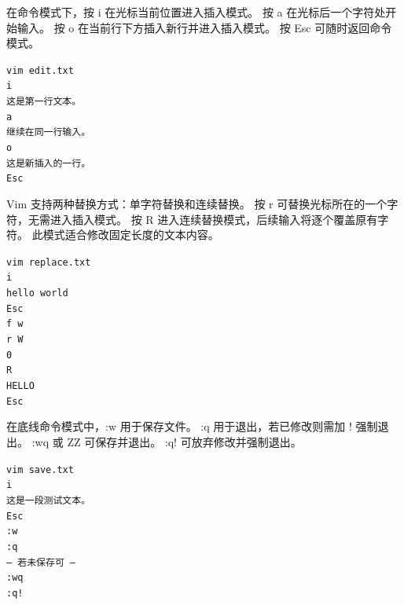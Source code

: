 \documentclass[a4paper, 12pt]{article}
\begin{document}
\begin{tcolorbox}[instancestyle, title=实例16：进入与退出插入模式]
在命令模式下，按 i 在光标当前位置进入插入模式。
按 a 在光标后一个字符处开始输入。
按 o 在当前行下方插入新行并进入插入模式。
按 Esc 可随时返回命令模式。

\texttt{vim edit.txt} \\
\texttt{i} \\
\texttt{这是第一行文本。} \\
\texttt{a} \\
\texttt{继续在同一行输入。} \\
\texttt{o} \\
\texttt{这是新插入的一行。} \\
\texttt{Esc}
\end{tcolorbox}

\begin{tcolorbox}[instancestyle, title=实例17：替换模式与文本覆盖]
Vim 支持两种替换方式：单字符替换和连续替换。
按 r 可替换光标所在的一个字符，无需进入插入模式。
按 R 进入连续替换模式，后续输入将逐个覆盖原有字符。
此模式适合修改固定长度的文本内容。

\texttt{vim replace.txt} \\
\texttt{i} \\
\texttt{hello world} \\
\texttt{Esc} \\
\texttt{f w} \\
\texttt{r W} \\
\texttt{0} \\
\texttt{R} \\
\texttt{HELLO} \\
\texttt{Esc}
\end{tcolorbox}

\begin{tcolorbox}[instancestyle, title=实例18：保存与退出操作]
在底线命令模式中，:w 用于保存文件。
:q 用于退出，若已修改则需加 ! 强制退出。
:wq 或 ZZ 可保存并退出。
:q! 可放弃修改并强制退出。

\texttt{vim save.txt} \\
\texttt{i} \\
\texttt{这是一段测试文本。} \\
\texttt{Esc} \\
\texttt{:w} \\
\texttt{:q} \\
\texttt{--- 若未保存可 ---} \\
\texttt{:wq} \\
\texttt{:q!}
\end{tcolorbox}
\end{document}
